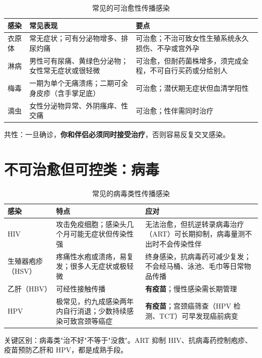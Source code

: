 \documentclass[12pt,UTF8,openany]{ctexbook}
\begin{document}
\begin{table}[htbp]
  \centering
  \caption{常见的可治愈性传播感染}
  \begin{tabularx}{\textwidth}{@{}l X X@{}}
    \toprule
    \textbf{感染} & \textbf{常见表现} & \textbf{要点} \\
    \midrule
    衣原体 & 常无症状；可有分泌物增多、排尿灼痛 & 可治愈；不治可致女性生殖系统永久损伤、不孕或宫外孕 \\
    淋病 & 男性可有尿痛、黄绿色分泌物；女性常无症状或很轻微 & 可治愈，但耐药菌株增多，须完成全程，不可自行买药或分给别人 \\
    梅毒 & 一期为单个无痛溃疡；二期可全身皮疹（含手掌足底） & 可治愈；潜伏期无症状但血清学阳性 \\
    滴虫 & 女性分泌物异常、外阴瘙痒、性交痛 & 可治愈；性伴需同时治疗 \\
    \bottomrule
  \end{tabularx}
\end{table}

\noindent 共性：一旦确诊，\textbf{你和伴侣必须同时接受治疗}，否则容易反复交叉感染。

\section{不可治愈但可控类：病毒}

\begin{table}[htbp]
  \centering
  \caption{常见的病毒类性传播感染}
  \begin{tabularx}{\textwidth}{@{}l X X@{}}
    \toprule
    \textbf{感染} & \textbf{特点} & \textbf{应对} \\
    \midrule
    HIV & 攻击免疫细胞；感染头几个月可能无症状但传染性强 & 无法治愈，但抗逆转录病毒治疗（ART）可长期抑制，病毒量测不出时不会传染性伴 \\
    生殖器疱疹（HSV） & 疼痛性水疱或溃疡，易复发；很多人无症状或极轻微 & 终身感染，抗病毒药可减少复发；不会经马桶、泳池、毛巾等日常物品传播 \\
    乙肝（HBV） & 可经性接触传播 & \textbf{有疫苗}；慢性感染需长期管理 \\
    HPV & 极常见，约九成感染两年内自行消退；少数持续感染可致宫颈等癌症 & \textbf{有疫苗}；宫颈癌筛查（HPV 检测、TCT）可早发现癌前病变 \\
    \bottomrule
  \end{tabularx}
\end{table}

\noindent 关键区别：病毒类"治不好"不等于"没救"。ART 抑制 HIV、抗病毒药控制疱疹、
疫苗预防乙肝和 HPV，都是成熟手段。
\end{document}
